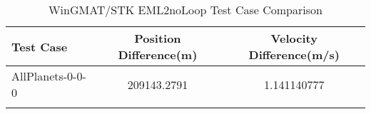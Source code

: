 \begin{table}[htbp!]
\centering
\caption{ WinGMAT/STK EML2noLoop Test Case Comparison}
      \begin{tabular}{lcc}
      \hline\hline
          Test Case & Position Difference(m) & Velocity Difference(m/s) \\
         \hline
         AllPlanets-0-0-0 & 209143.2791 & 1.141140777 \\
      \hline\hline
      \label{Table: EML2noLoop WinGMAT-STK Table} 
\end{tabular}
\end{table}
